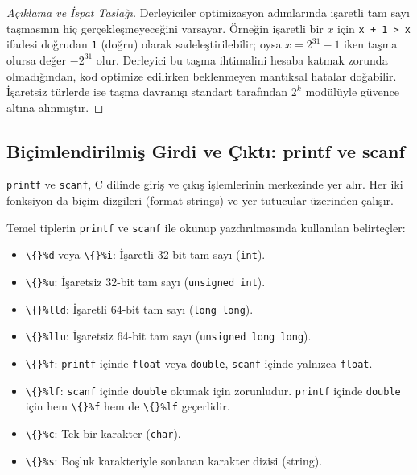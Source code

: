 \begin{proof}[Açıklama ve İspat Taslağı]
Derleyiciler optimizasyon adımlarında işaretli tam sayı taşmasının hiç gerçekleşmeyeceğini varsayar. Örneğin işaretli bir $x$ için \texttt{x + 1 > x} ifadesi doğrudan \texttt{1} (doğru) olarak sadeleştirilebilir; oysa $x = 2^{31}-1$ iken taşma olursa değer $-2^{31}$ olur. Derleyici bu taşma ihtimalini hesaba katmak zorunda olmadığından, kod optimize edilirken beklenmeyen mantıksal hatalar doğabilir. İşaretsiz türlerde ise taşma davranışı standart tarafından $2^k$ modülüyle güvence altına alınmıştır.
\end{proof}

\subsection{Biçimlendirilmiş Girdi ve Çıktı: printf ve scanf}

\texttt{printf} ve \texttt{scanf}, C dilinde giriş ve çıkış işlemlerinin merkezinde yer alır. Her iki fonksiyon da biçim dizgileri (format strings) ve yer tutucular üzerinden çalışır.

\begin{definition}
Temel tiplerin \texttt{printf} ve \texttt{scanf} ile okunup yazdırılmasında kullanılan belirteçler:
\begin{itemize}
    \item \texttt{\textbackslash\{\}\%d} veya \texttt{\textbackslash\{\}\%i}: İşaretli 32-bit tam sayı (\texttt{int}).
    \item \texttt{\textbackslash\{\}\%u}: İşaretsiz 32-bit tam sayı (\texttt{unsigned int}).
    \item \texttt{\textbackslash\{\}\%lld}: İşaretli 64-bit tam sayı (\texttt{long long}).
    \item \texttt{\textbackslash\{\}\%llu}: İşaretsiz 64-bit tam sayı (\texttt{unsigned long long}).
    \item \texttt{\textbackslash\{\}\%f}: \texttt{printf} içinde \texttt{float} veya \texttt{double}, \texttt{scanf} içinde yalnızca \texttt{float}.
    \item \texttt{\textbackslash\{\}\%lf}: \texttt{scanf} içinde \texttt{double} okumak için zorunludur. \texttt{printf} içinde \texttt{double} için hem \texttt{\textbackslash\{\}\%f} hem de \texttt{\textbackslash\{\}\%lf} geçerlidir.
    \item \texttt{\textbackslash\{\}\%c}: Tek bir karakter (\texttt{char}).
    \item \texttt{\textbackslash\{\}\%s}: Boşluk karakteriyle sonlanan karakter dizisi (string).
\end{itemize}
\end{definition}

